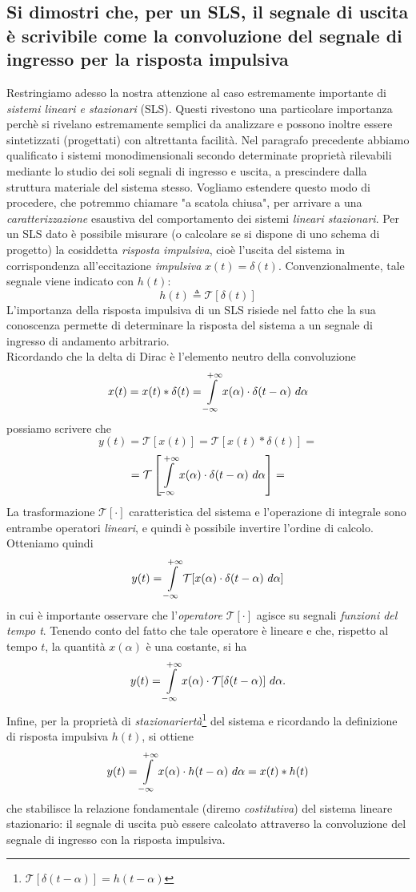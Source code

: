 \documentclass[12pt,oneside,openany]{memoir}
\numberwithin{equation}{subsection}
\begin{document}
\subsection{Si dimostri che, per un SLS, il segnale di uscita \`e scrivibile
come la convoluzione del segnale di ingresso per la risposta impulsiva}
Restringiamo adesso la nostra attenzione al caso estremamente importante di
\textit{sistemi lineari e stazionari} (SLS). Questi rivestono una particolare
importanza perch\`e si rivelano estremamente semplici da analizzare e possono
inoltre essere sintetizzati (progettati) con altrettanta facilit\`a.
\bigbreak
Nel paragrafo precedente abbiamo qualificato i sistemi monodimensionali secondo
determinate propriet\`a rilevabili mediante lo studio dei soli segnali di
ingresso e uscita, a prescindere dalla struttura materiale del sistema stesso.
Vogliamo estendere questo modo di procedere, che potremmo chiamare "a scatola
chiusa", per arrivare a una \textit{caratterizzazione} esaustiva del
comportamento dei sistemi \textit{lineari stazionari}.
\bigbreak
Per un SLS dato \`e possibile misurare (o calcolare se si dispone di uno schema
di progetto) la cosiddetta \textit{risposta impulsiva}, cio\`e l'uscita del
sistema in corrispondenza all'eccitazione \textit{impulsiva} $x(t) = \delta(t)$.
Convenzionalmente, tale segnale viene indicato con $h(t)$:
\[
    h(t) \triangleq \mathcal{T}[\delta(t)]
\]
L'importanza della risposta impulsiva di un SLS risiede nel fatto che la sua
conoscenza permette di determinare la risposta del sistema a un segnale di
ingresso di andamento arbitrario.\\
Ricordando che la delta di Dirac \`e l'elemento neutro della convoluzione
\[
    x(t) = x(t) * \delta(t) = \int\displaylimits_{-\infty}^{+\infty} x(\alpha)
    \cdot \delta(t - \alpha) \ d\alpha
\]
possiamo scrivere che
\[
    y(t) = \mathcal{T}[x(t)] = \mathcal{T}[x(t) * \delta(t)] =
\]
\[
    = \mathcal{T}\left[\int\displaylimits_{-\infty}^{+\infty} x(\alpha)
    \cdot \delta(t - \alpha) \ d\alpha\right] =
\]
La trasformazione $\mathcal{T}[\cdot]$ caratteristica del sistema e
l'operazione di integrale sono entrambe operatori \textit{lineari}, e quindi \`e
possibile invertire l'ordine di calcolo. Otteniamo quindi
\[
    y(t) = \int\displaylimits_{-\infty}^{+\infty} \mathcal{T} [x(\alpha) \cdot
    \delta(t - \alpha) \ d\alpha]
\]
in cui \`e importante osservare che l'\textit{operatore} $\mathcal{T}[\cdot]$
agisce su segnali \textit{funzioni del tempo t}. Tenendo conto del fatto che
tale operatore \`e lineare e che, rispetto al tempo $t$, la quantit\`a
$x(\alpha)$ \`e una costante, si ha
\[
    y(t) = \int\displaylimits_{-\infty}^{+\infty} x(\alpha) \cdot
    \mathcal{T}[\delta(t - \alpha)] \ d\alpha.
\]
Infine, per la propriet\`a di \textit{stazionariert\`a}\footnote{$\mathcal{T}
[\delta(t - \alpha)] = h(t - \alpha)$} del sistema e
ricordando la definizione di risposta impulsiva $h(t)$, si ottiene
\[
    y(t) = \int\displaylimits_{-\infty}^{+\infty} x(\alpha) \cdot h(t - \alpha)
    \ d\alpha = x(t) * h(t)
\]
che stabilisce la relazione fondamentale (diremo \textit{costitutiva}) del
sistema lineare stazionario: il segnale di uscita pu\`o essere calcolato
attraverso la convoluzione del segnale di ingresso con la risposta impulsiva.
\end{document}
